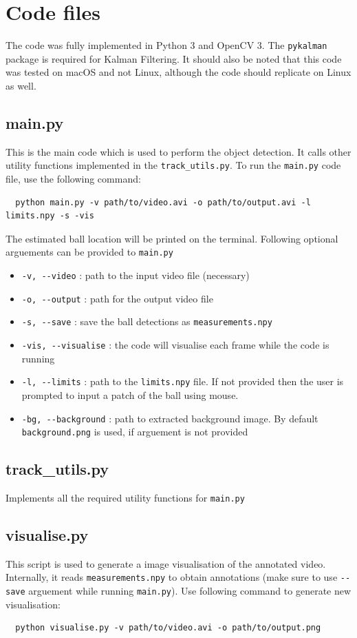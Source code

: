 \documentclass[12pt]{article}
\begin{document}
\section*{Code files}
The code was fully implemented in Python 3 and OpenCV 3. The \verb|pykalman| package is required for Kalman Filtering. It should also be noted that this code was tested on macOS and not Linux, although the code should replicate on Linux as well.
\subsection*{main.py}
This is the main code which is used to perform the object detection. It calls other utility functions implemented in the \verb|track_utils.py|. To run the \verb|main.py| code file, use the following command:
\begin{verbatim}
  python main.py -v path/to/video.avi -o path/to/output.avi -l limits.npy -s -vis
\end{verbatim}
The estimated ball location will be printed on the terminal. Following optional arguements can be provided to \verb|main.py|
\begin{itemize}
  \item \verb|-v, --video| : path to the input video file (necessary)
  \item \verb|-o, --output| : path for the output video file
  \item \verb|-s, --save| : save the ball detections as \verb|measurements.npy|
  \item \verb|-vis, --visualise| : the code will visualise each frame while the code is running
  \item \verb|-l, --limits| : path to the \verb|limits.npy| file. If not provided then the user is prompted to input a patch of the ball using mouse.
  \item \verb|-bg, --background| : path to extracted background image. By default \verb|background.png| is used, if arguement is not provided
\end{itemize}

\subsection*{track\_utils.py}
Implements all the required utility functions for \verb|main.py|

\subsection*{visualise.py}
This script is used to generate a image visualisation of the annotated video. Internally, it reads \verb|measurements.npy| to obtain annotations (make sure to use \verb|--save| arguement while running \verb|main.py|). Use following command to generate new visualisation:
\begin{verbatim}
  python visualise.py -v path/to/video.avi -o path/to/output.png
\end{verbatim}
\end{document}
